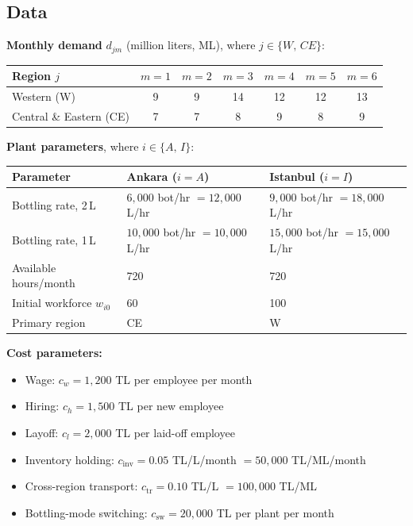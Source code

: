 \documentclass[12pt,a4paper]{article}
\begin{document}
\subsection*{Data}

\textbf{Monthly demand} $d_{jm}$ (million liters, ML), where $j\in\{W,\,CE\}$:

\begin{center}
\begin{tabular}{lcccccc}
\toprule
Region $j$ & $m=1$ & $m=2$ & $m=3$ & $m=4$ & $m=5$ & $m=6$ \\
\midrule
Western (W)             & 9 & 9 & 14 & 12 & 12 & 13 \\
Central \& Eastern (CE) & 7 & 7 &  8 &  9 &  8 &  9 \\
\bottomrule
\end{tabular}
\end{center}

\textbf{Plant parameters}, where $i\in\{A,\,I\}$:

\begin{center}
\begin{tabular}{lll}
\toprule
Parameter & Ankara ($i=A$) & Istanbul ($i=I$) \\
\midrule
Bottling rate, 2\,L & $6{,}000$ bot/hr $=12{,}000$ L/hr & $9{,}000$ bot/hr $=18{,}000$ L/hr \\
Bottling rate, 1\,L & $10{,}000$ bot/hr $=10{,}000$ L/hr & $15{,}000$ bot/hr $=15{,}000$ L/hr \\
Available hours/month & 720 & 720 \\
Initial workforce $w_{i0}$ & 60 & 100 \\
Primary region & CE & W \\
\bottomrule
\end{tabular}
\end{center}

\textbf{Cost parameters:}
\begin{itemize}
  \item Wage: $c_w = 1{,}200$ TL per employee per month
  \item Hiring: $c_h = 1{,}500$ TL per new employee
  \item Layoff: $c_l = 2{,}000$ TL per laid-off employee
  \item Inventory holding: $c_{\text{inv}} = 0.05$ TL/L/month $= 50{,}000$ TL/ML/month
  \item Cross-region transport: $c_{\text{tr}} = 0.10$ TL/L $= 100{,}000$ TL/ML
  \item Bottling-mode switching: $c_{\text{sw}} = 20{,}000$ TL per plant per month
\end{itemize}
\end{document}
